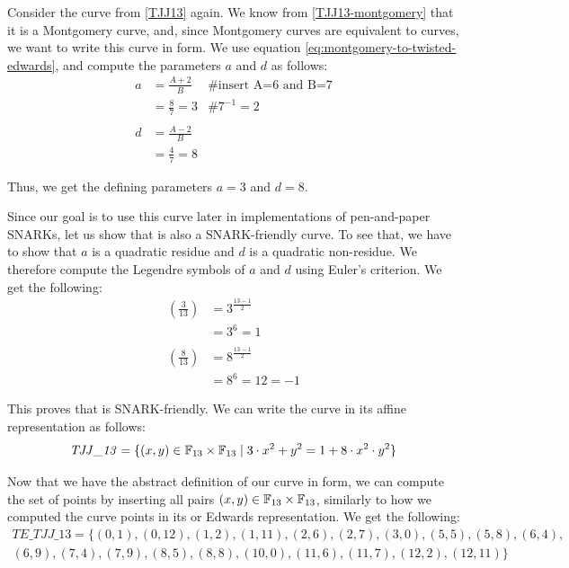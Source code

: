 \begin{example}\label{ex:TJJ13-twisted-edwards}Consider the  curve from \examplename{} \ref{TJJ13} again. We know from \examplename{} \ref{TJJ13-montgomery} that it is a Montgomery curve, and, since Montgomery curves are equivalent to  curves, we want to write this curve in  form. We use equation \eqref{eq:montgomery-to-twisted-edwards}, and compute the parameters $a$ and $d$ as follows:
\begin{align*}
a & = \frac{A+2}{B} & \text{\# insert A=6 and B=7}\\
  & = \frac{8}{7} = 3 & \text{\# } 7^{-1}= 2 \\
  \\
d & = \frac{A-2}{B} \\
  & = \frac{4}{7} = 8 
\end{align*}

Thus, we get the defining parameters  $a= 3$ and $d=8$. 

Since our goal is to use this curve later in implementations of pen-and-paper SNARKs, let us show that  is also a SNARK-friendly  curve. To see that, we  have to show that $a$ is a quadratic residue and $d$ is a quadratic non-residue. We therefore compute the Legendre symbols of $a$ and $d$ using Euler's criterion. We get the following:
\begin{align*}
\left(\frac{3}{13}\right) &= 3^{\frac{13-1}{2}} \\
                          & = 3^6 
                            = 1\\
                          \\
\left(\frac{8}{13}\right) &= 8^{\frac{13-1}{2}} \\
                          & = 8^6 
                            = 12
                            = -1                     
\end{align*}

This proves that  is SNARK-friendly. We can write the  curve in its affine  representation as follows:
\begin{equation}\label{eq:TJJ13-twisted-edwards}
\mathit{TJJ\_13} = \{(x,y)\in \mathbb{F}_{13}\times \mathbb{F}_{13}\;|\; 3\cdot x^{2} + y^2 =1+ 8\cdot x^{2}\cdot y^2 \}
\end{equation}

Now that we have the abstract definition of our  curve in  form, we can compute the set of points by inserting all pairs $(x,y)\in\mathbb{F}_{13}\times \mathbb{F}_{13}$, similarly to how we computed the curve points in its  or Edwards representation. We get the following:
\begin{equation}
\begin{split}
\mathit{TE\_TJJ\_13} = \{(0, 1),(0, 12),(1, 2),(1, 11),(2, 6),(2, 7),(3, 0),(5, 5),(5, 8),(6, 4),\\
(6, 9),(7, 4),(7, 9),(8, 5),(8, 8),(10, 0),(11, 6),(11, 7),(12, 2),(12, 11)\}
\end{split}
\end{equation}


\end{example}
